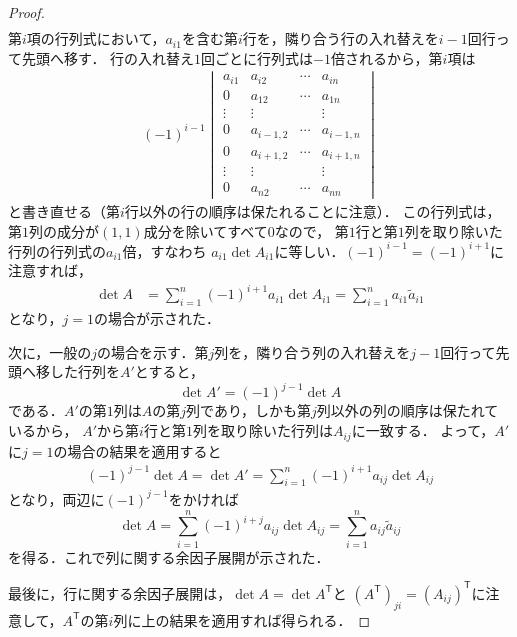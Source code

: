 \begin{leftbar}
\begin{proof}
\begin{align*}
\end{align*}
第$i$項の行列式において，$a_{i1}$を含む第$i$行を，隣り合う行の入れ替えを$i-1$回行って先頭へ移す．
行の入れ替え$1$回ごとに行列式は$-1$倍されるから，第$i$項は
\begin{align*}
  (-1)^{i-1}
  \begin{vmatrix}
    a_{i1} & a_{i2}     & \cdots & a_{in} \\
    0      & a_{12}     & \cdots & a_{1n} \\
    \vdots & \vdots     &        & \vdots \\
    0      & a_{i-1,2}  & \cdots & a_{i-1,n} \\
    0      & a_{i+1,2}  & \cdots & a_{i+1,n} \\
    \vdots & \vdots     &        & \vdots \\
    0      & a_{n2}     & \cdots & a_{nn}
  \end{vmatrix}
\end{align*}
と書き直せる（第$i$行以外の行の順序は保たれることに注意）．
この行列式は，第$1$列の成分が$(1,1)$成分を除いてすべて$0$なので，
第$1$行と第$1$列を取り除いた行列の行列式の$a_{i1}$倍，すなわち
$a_{i1}\det A_{i1}$に等しい．$(-1)^{i-1} = (-1)^{i+1}$に注意すれば，
\begin{align*}
  \det A
  &= \sum_{i=1}^{n} (-1)^{i+1} a_{i1} \det A_{i1}
   = \sum_{i=1}^{n} a_{i1} \tilde{a}_{i1}
\end{align*}
となり，$j=1$の場合が示された．

次に，一般の$j$の場合を示す．第$j$列を，隣り合う列の入れ替えを$j-1$回行って先頭へ移した行列を$A'$とすると，
\[
  \det A' = (-1)^{j-1} \det A
\]
である．$A'$の第$1$列は$A$の第$j$列であり，しかも第$j$列以外の列の順序は保たれているから，
$A'$から第$i$行と第$1$列を取り除いた行列は$A_{ij}$に一致する．
よって，$A'$に$j=1$の場合の結果を適用すると
\begin{align*}
  (-1)^{j-1} \det A = \det A'
  = \sum_{i=1}^{n} (-1)^{i+1} a_{ij} \det A_{ij}
\end{align*}
となり，両辺に$(-1)^{j-1}$をかければ
\[
  \det A = \sum_{i=1}^{n} (-1)^{i+j} a_{ij} \det A_{ij}
         = \sum_{i=1}^{n} a_{ij} \tilde{a}_{ij}
\]
を得る．これで列に関する余因子展開が示された．

最後に，行に関する余因子展開は，$\det A = \det A^\mathsf{T}$と
$(A^\mathsf{T})_{ji} = (A_{ij})^\mathsf{T}$に注意して，$A^\mathsf{T}$の第$i$列に上の結果を適用すれば得られる．
\end{proof}
\end{leftbar}

